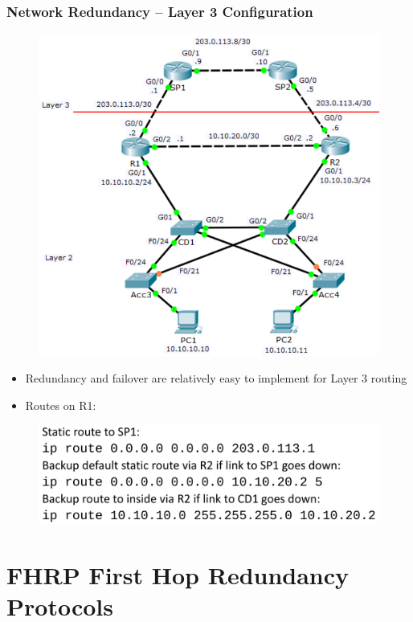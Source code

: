 \documentclass[pdflatex,compress,mathserif]{beamer}
\begin{document}
\begin{frame}
	\frametitle{Network Redundancy – Layer 3 Configuration}
	\begin{multicols}{2}
		\begin{figure}
			\centering
			\includegraphics[width=\linewidth]{img/img05}
		\end{figure}
		\columnbreak
		\begin{itemize}
			\item Redundancy and failover are relatively
easy to implement for Layer 3 routing
			\item Routes on R1:
		\end{itemize}
		\begin{figure}
			\centering
			\includegraphics[height=0.3\linewidth]{img/img06}
		\end{figure}
	\end{multicols}
\end{frame}

\section{FHRP First Hop Redundancy Protocols}
\end{document}
